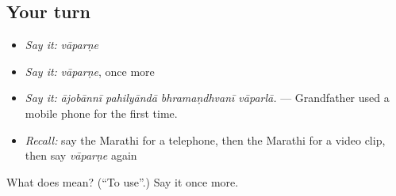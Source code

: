 \subsection*{Your turn}
\begin{itemize}
\raggedright
  \item \emph{Say it:} \emph{vāparṇe}
  \item \emph{Say it:} \emph{vāparṇe}, once more
  \item \emph{Say it:} \emph{ājobānnī pahilyāndā bhramaṇdhvanī vāparlā.} — Grandfather used a mobile phone for the first time.
  \item \emph{Recall:} say the Marathi for a telephone, then the Marathi for a video clip, then say \emph{vāparṇe} again
\end{itemize}

\begin{tcolorbox}[breakable,colback=teal!4,colframe=teal!35!black,title={Before you move on}]
What does  mean? (\textquotedblleft{}To use\textquotedblright{}.) Say it once more.
\end{tcolorbox}
